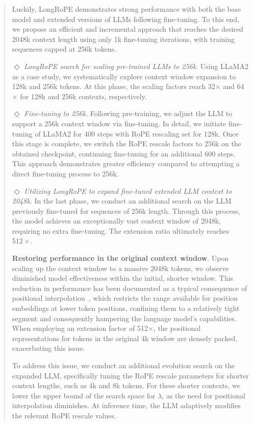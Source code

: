 \begin{abstract}
Luckily, LongRoPE demonstrates strong performance with both the base model and extended versions of LLMs following fine-tuning. To this end, we propose an efficient and incremental approach that reaches the desired 2048k context length using only 1k fine-tuning iterations, with training sequences capped at 256k tokens.

$\Diamond$ \textit{LongRoPE search for scaling pre-trained LLMs to 256k}. Using LLaMA2 as a case study, we systematically explore context window expansion to 128k and 256k tokens. At this phase, the scaling factors reach 32$\times$ and 64$\times$ for 128k and 256k contexts, respectively.

$\Diamond$ \textit{Fine-tuning to 256k}. Following pre-training, we adjust the LLM to support a 256k context window via fine-tuning. In detail, we initiate fine-tuning of LLaMA2 for 400 steps with RoPE rescaling set for 128k. Once this stage is complete, we switch the RoPE rescale factors to 256k on the obtained checkpoint, continuing fine-tuning for an additional 600 steps. This approach demonstrates greater efficiency compared to attempting a direct fine-tuning process to 256k.

$\Diamond$ \textit{Utilizing LongRoPE to expand fine-tuned extended LLM context to 2048k}. In the last phase, we conduct an additional search on the LLM previously fine-tuned for sequences of 256k length. Through this process, the model achieves an exceptionally vast context window of 2048k, requiring no extra fine-tuning. The extension ratio ultimately reaches $512\times$.

\textbf{Restoring performance in the original context window}.  Upon scaling up the context window to a massive 2048k tokens, we observe diminished model effectiveness within the initial, shorter window. This reduction in performance has been documented as a typical consequence of positional interpolation~\cite{pi}, which restricts the range available for position embeddings at lower token positions, confining them to a relatively tight segment and consequently hampering the language model’s capabilities. When employing an extension factor of 512$\times$, the positional representations for tokens in the original 4k window are densely packed, exacerbating this issue.

To address this issue, we conduct an additional evolution search on the expanded LLM, specifically tuning the RoPE rescale parameters for shorter context lengths, such as 4k and 8k tokens. For these shorter contexts, we lower the upper bound of the search space for $\lambda$, as the need for positional interpolation diminishes. At inference time, the LLM adaptively modifies the relevant RoPE rescale values.


\end{abstract}
